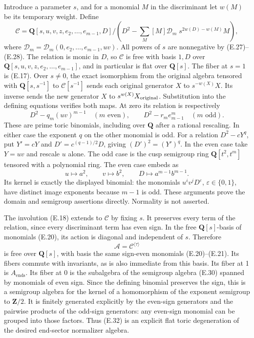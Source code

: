 \documentclass[
  10pt,
]{article}
\begin{document}
Introduce a parameter \(s\), and for a monomial \(M\) in the
discriminant let \(w(M)\) be its temporary weight. Define \[
\mathscr C=
\mathbf Q[s,u,v,z,e_2,\ldots,e_{m-1},D]
\Big/\left(D^2-
\sum_M [M]\mathcal D_m\;s^{2w(D)-w(M)}M\right),
\tag{E.29}
\] where \(\mathcal D_m=\mathcal D_m(0,e_2,\ldots,e_{m-1},uv)\). All
powers of \(s\) are nonnegative by (E.27)--(E.28). The relation is monic
in \(D\), so \(\mathscr C\) is free with basis \(1,D\) over
\(\mathbf Q[s,u,v,z,e_2,\ldots,e_{m-1}]\), and in particular is flat
over \(\mathbf Q[s]\). The fiber at \(s=1\) is (E.17). Over \(s\ne0\),
the exact isomorphism from the original algebra tensored with
\(\mathbf Q[s,s^{-1}]\) to \(\mathscr C[s^{-1}]\) sends each original
generator \(X\) to \(s^{-w(X)}X\). Its inverse sends the new generator
\(X\) to \(s^{w(X)}X_{\rm original}\). Substitution into the defining
equations verifies both maps. At zero its relation is respectively \[
D^2-q_m(uv)^{m-1}\quad(m\text{ even}),\qquad
D^2-r_m e_{m-1}^{m}\quad(m\text{ odd}).
\tag{E.30}
\] These are prime toric binomials, including over \(\mathbf Q\) after a
rational rescaling. In either case the exponent \(q\) on the other
monomial is odd. For a relation \(D^2-cY^q\), put \(Y'=cY\) and
\(D'=c^{(q-1)/2}D\), giving \((D')^2=(Y')^q\). In the even case take
\(Y=uv\) and rescale \(u\) alone. The odd case is the cusp semigroup
ring \(\mathbf Q[t^2,t^m]\) tensored with a polynomial ring. The even
case embeds as \[
u\longmapsto a^2,\qquad v\longmapsto b^2,
\qquad D\longmapsto a^{m-1}b^{m-1}.
\tag{E.31}
\] Its kernel is exactly the displayed binomial: the monomials
\(u^i v^j D^\varepsilon\), \(\varepsilon\in\{0,1\}\), have distinct
image exponents because \(m-1\) is odd. These arguments prove the domain
and semigroup assertions directly. Normality is not asserted.

The involution (E.18) extends to \(\mathscr C\) by fixing \(s\). It
preserves every term of the relation, since every discriminant term has
even sign. In the free \(\mathbf Q[s]\)-basis of monomials (E.20), its
action is diagonal and independent of \(s\). Therefore \[
\mathscr A=\mathscr C^{\langle\tau\rangle}
\tag{E.32}
\] is free over \(\mathbf Q[s]\), with basis the same sign-even
monomials (E.20)--(E.21). Its fibers commute with invariants, as is also
immediate from this basis. Its fiber at 1 is \(A_{\mathrm{ends}}\). Its
fiber at 0 is the subalgebra of the semigroup algebra (E.30) spanned by
monomials of even sign. Since the defining binomial preserves the sign,
this is a semigroup algebra for the kernel of a homomorphism of the
exponent semigroup to \(\mathbf Z/2\). It is finitely generated
explicitly by the even-sign generators and the pairwise products of the
odd-sign generators: any even-sign monomial can be grouped into those
factors. Thus (E.32) is an explicit flat toric degeneration of the
desired end-sector normalizer algebra.
\end{document}
